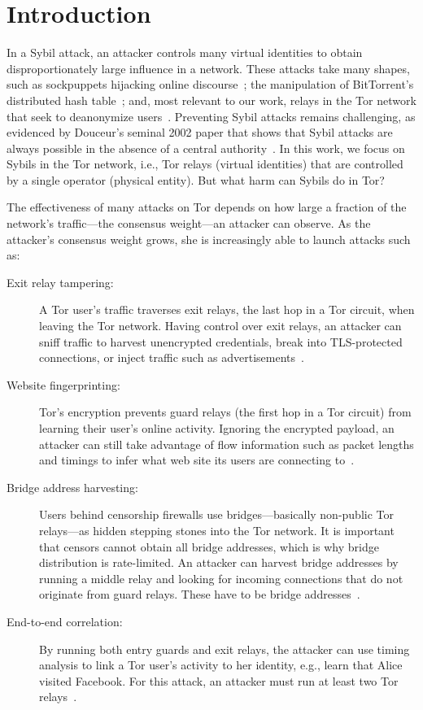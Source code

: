 \section{Introduction}
\label{sec:introduction}

In a Sybil attack, an attacker controls many virtual identities to
obtain disproportionately large influence in a network.  These attacks take many
shapes, such as sockpuppets hijacking online discourse~\cite{Thomas2012a}; the
manipulation of BitTorrent's distributed hash table~\cite{Wang2012a}; and, most
relevant to our work, relays in the Tor network that seek to deanonymize
users~\cite{cmucert}.  Preventing Sybil attacks remains challenging, as
evidenced by Douceur's seminal 2002 paper that shows that Sybil attacks are
always possible in the absence of a central authority~\cite{Douceur2002a}.  In
this work, we focus on Sybils in the Tor network, i.e., Tor relays (virtual
identities) that are controlled by a single operator (physical entity).  But
what harm can Sybils do in Tor?

The effectiveness of many attacks on Tor depends on how large a fraction of the
network's traffic---the consensus weight---an attacker can observe.  As the
attacker's consensus weight grows, she is increasingly able to launch attacks
such as:
\begin{description}
	\item[Exit relay tampering:] A Tor user's traffic traverses exit relays, the
		last hop in a Tor circuit, when leaving the Tor network.  Having control
		over exit relays, an attacker can sniff traffic to harvest unencrypted
		credentials, break into TLS-protected connections, or inject traffic
		such as advertisements~\cite{Winter2014a}.
	\item[Website fingerprinting:] Tor's encryption prevents guard relays (the
		first hop in a Tor circuit) from learning their user's online activity.
		Ignoring the encrypted payload, an attacker can still take advantage of
		flow information such as packet lengths and timings to infer what web
		site its users are connecting to~\cite{Juarez2014a}.
	\item[Bridge address harvesting:] Users behind censorship firewalls use
		bridges---basically non-public Tor relays---as hidden stepping stones
		into the Tor network.  It is important that censors cannot obtain all bridge
		addresses, which is why bridge distribution is rate-limited.  An
		attacker can harvest bridge addresses by running a middle relay and
		looking for incoming connections that do not originate from guard
		relays.  These have to be bridge addresses~\cite{Ling2012a}.
	\item[End-to-end correlation:] By running both entry guards and exit relays,
		the attacker can use timing analysis to link a Tor user's activity to
		her identity, e.g., learn that Alice visited Facebook.  For this attack,
		an attacker must run at least two Tor relays~\cite{Johnson2013a}.
\end{description}

